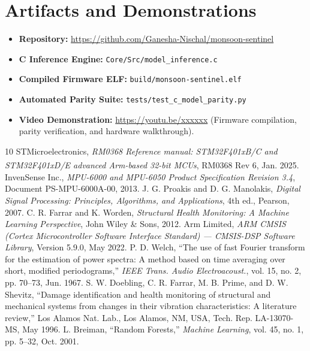 \documentclass[twocolumn]{article}
\begin{document}
\section*{Artifacts and Demonstrations}
\begin{itemize}[noitemsep]
    \item \textbf{Repository:} \url{https://github.com/Ganesha-Nischal/monsoon-sentinel}
    \item \textbf{C Inference Engine:} \texttt{Core/Src/model\_inference.c}
    \item \textbf{Compiled Firmware ELF:} \texttt{build/monsoon-sentinel.elf}
    \item \textbf{Automated Parity Suite:} \texttt{tests/test\_c\_model\_parity.py}
    \item \textbf{Video Demonstration:} \url{https://youtu.be/xxxxxx} (Firmware compilation, parity verification, and hardware walkthrough).
\end{itemize}

\vfill\pagebreak
{\fontsize{8}{9}\selectfont
\begin{thebibliography}{10}
 STMicroelectronics, \textit{RM0368 Reference manual: STM32F401xB/C and STM32F401xD/E advanced Arm\textsuperscript{\textregistered}-based 32-bit MCUs}, RM0368 Rev 6, Jan. 2025.
 InvenSense Inc., \textit{MPU-6000 and MPU-6050 Product Specification Revision 3.4}, Document PS-MPU-6000A-00, 2013.
 J. G. Proakis and D. G. Manolakis, \textit{Digital Signal Processing: Principles, Algorithms, and Applications}, 4th ed., Pearson, 2007.
 C. R. Farrar and K. Worden, \textit{Structural Health Monitoring: A Machine Learning Perspective}, John Wiley \& Sons, 2012.
 Arm Limited, \textit{ARM CMSIS (Cortex Microcontroller Software Interface Standard) --- CMSIS-DSP Software Library}, Version 5.9.0, May 2022.
 P. D. Welch, ``The use of fast Fourier transform for the estimation of power spectra: A method based on time averaging over short, modified periodograms,'' \textit{IEEE Trans. Audio Electroacoust.}, vol. 15, no. 2, pp. 70--73, Jun. 1967.
 S. W. Doebling, C. R. Farrar, M. B. Prime, and D. W. Shevitz, ``Damage identification and health monitoring of structural and mechanical systems from changes in their vibration characteristics: A literature review,'' Los Alamos Nat. Lab., Los Alamos, NM, USA, Tech. Rep. LA-13070-MS, May 1996.
 L. Breiman, ``Random Forests,'' \textit{Machine Learning}, vol. 45, no. 1, pp. 5--32, Oct. 2001.

\end{thebibliography}
}
\end{document}
